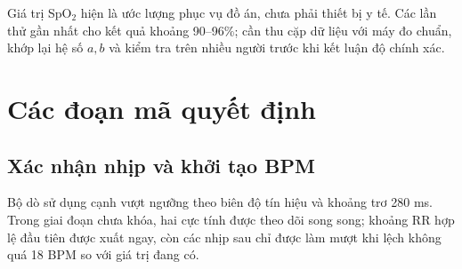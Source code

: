 \documentclass[12pt]{article}
\begin{document}
\Needspace{0.22\textheight}
\begin{warningbox}
Giá trị SpO$_2$ hiện là ước lượng phục vụ đồ án, chưa phải thiết bị y tế. Các lần thử gần nhất cho kết quả khoảng 90--96\%; cần thu cặp dữ liệu với máy đo chuẩn, khớp lại hệ số $a,b$ và kiểm tra trên nhiều người trước khi kết luận độ chính xác.
\end{warningbox}

\Needspace{0.48\textheight}
\section{Các đoạn mã quyết định}

\subsection{Xác nhận nhịp và khởi tạo BPM}

Bộ dò sử dụng cạnh vượt ngưỡng theo biên độ tín hiệu và khoảng trơ 280 ms. Trong giai đoạn chưa khóa, hai cực tính được theo dõi song song; khoảng RR hợp lệ đầu tiên được xuất ngay, còn các nhịp sau chỉ được làm mượt khi lệch không quá 18 BPM so với giá trị đang có.
\end{document}
